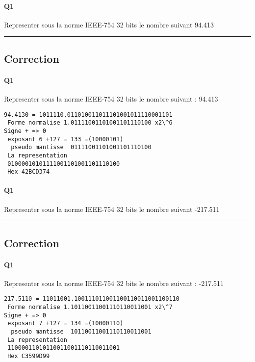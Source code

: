 \paragraph{Q1}

Representer sous la norme IEEE-754 32 bits le nombre suivant
94.413

\hrule width 1\linewidth
\pagebreak

\subsection{Correction}


\paragraph{Q1}

Representer sous la norme IEEE-754 32 bits le nombre suivant : 94.413

\begin{verbatim}94.4130 = 1011110.011010011011101001011110001101
 Forme normalise 1.01111001101001101110100 x2\^6
Signe + => 0
 exposant 6 +127 = 133 =(10000101)
  pseudo mantisse  01111001101001101110100 
 La representation 
 01000010101111001101001101110100
 Hex 42BCD374

\end{verbatim}
\pagebreak

\paragraph{Q1}

Representer sous la norme IEEE-754 32 bits le nombre suivant
-217.511

\hrule width 1\linewidth
\pagebreak

\subsection{Correction}


\paragraph{Q1}

Representer sous la norme IEEE-754 32 bits le nombre suivant : -217.511

\begin{verbatim}217.5110 = 11011001.100111011001100110011001100110
 Forme normalise 1.10110011001110110011001 x2\^7
Signe + => 0
 exposant 7 +127 = 134 =(10000110)
  pseudo mantisse  10110011001110110011001 
 La representation 
 11000011010110011001110110011001
 Hex C3599D99

\end{verbatim}
\pagebreak

